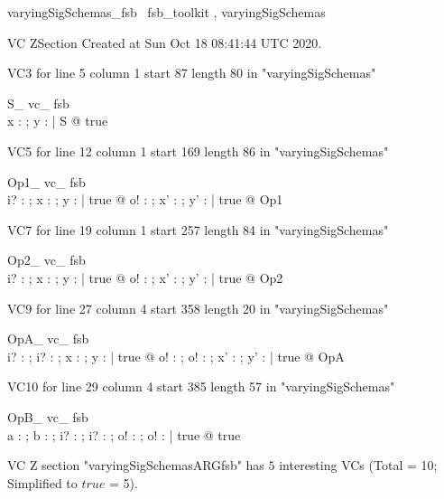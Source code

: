 \documentclass{article}
\begin{document}

\begin{zsection}	 \SECTION varyingSigSchemas\_fsb \parents~fsb\_toolkit , varyingSigSchemas
\end{zsection}

VC ZSection Created at Sun Oct 18 08:41:44 UTC 2020.

VC3 for line 5 column 1 start 87 length 80 in "varyingSigSchemas"
\begin{theorem}{ S\_ vc\_ fsb}\\
 \exists x : \nat ; y : \power \nat | S @ true \\

\end{theorem}

VC5 for line 12 column 1 start 169 length 86 in "varyingSigSchemas"
\begin{theorem}{ Op1\_ vc\_ fsb}\\
 \forall i? : \nat ; x : \nat ; y : \power \nat | true @ \exists o! : \nat ; x' : \nat ; y' : \power \nat | true @ Op1 \\

\end{theorem}

VC7 for line 19 column 1 start 257 length 84 in "varyingSigSchemas"
\begin{theorem}{ Op2\_ vc\_ fsb}\\
 \forall i? : \nat ; x : \nat ; y : \power \nat | true @ \exists o! : \nat ; x' : \nat ; y' : \power \nat | true @ Op2 \\

\end{theorem}

VC9 for line 27 column 4 start 358 length 20 in "varyingSigSchemas"
\begin{theorem}{ OpA\_ vc\_ fsb}\\
 \forall i? : \nat ; i? : \nat ; x : \nat ; y : \power \nat | true @ \exists o! : \nat ; o! : \nat ; x' : \nat ; y' : \power \nat | true @ OpA \\

\end{theorem}

VC10 for line 29 column 4 start 385 length 57 in "varyingSigSchemas"
\begin{theorem}{ OpB\_ vc\_ fsb}\\
 \exists a : \nat \cap \nat ; b : \power \nat \cap \power \nat ; i? : \nat ; i? : \nat ; o! : \nat ; o! : \nat | true @ true \\

\end{theorem}



 VC Z section "varyingSigSchemasARGfsb" has $5$ interesting VCs (Total = 10; Simplified to $true$ = 5).



\end{document}
